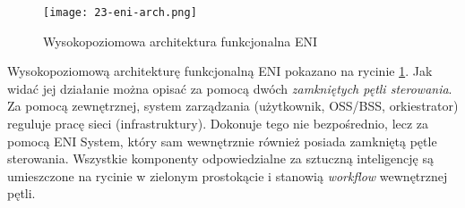 \begin{figure}[!h]
    \centering \texttt{[image: 23-eni-arch.png]}
    \caption{Wysokopoziomowa architektura funkcjonalna ENI}\label{fig:23-eni-arch}
\end{figure}

Wysokopoziomową architekturę funkcjonalną ENI pokazano na rycinie \ref{fig:23-eni-arch}. Jak widać jej działanie można opisać za pomocą dwóch \textit{zamkniętych pętli sterowania}. Za pomocą zewnętrznej, system zarządzania (użytkownik, OSS/BSS, orkiestrator) reguluje pracę sieci (infrastruktury). Dokonuje tego nie bezpośrednio, lecz za pomocą ENI System, który sam wewnętrznie również posiada zamkniętą pętle sterowania. Wszystkie komponenty odpowiedzialne za sztuczną inteligencję są umieszczone na rycinie w zielonym prostokącie i stanowią \textit{workflow} wewnętrznej pętli. 